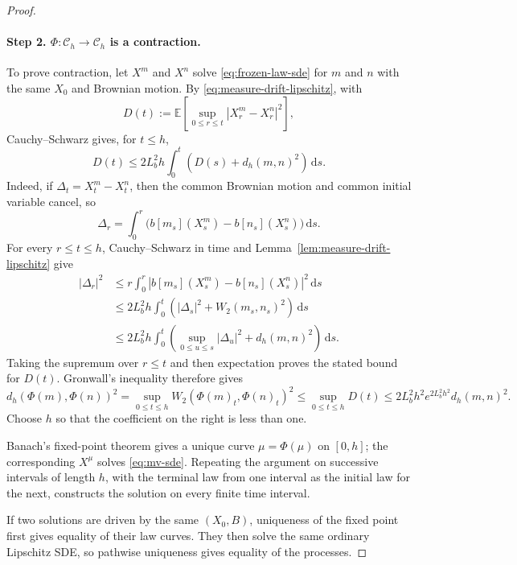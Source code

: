 \documentclass[11pt]{amsart}
\numberwithin{equation}{section}
\theoremstyle{plain}
\newcommand{\E}{\mathbb{E}}
\newcommand{\dd}{\,\mathrm{d}}
\newcommand{\abs}[1]{\left\lvert#1\right\rvert}
\begin{document}
\begin{proof}
\paragraph{\textbf{Step 2. $\Phi:\mathcal C_h\to\mathcal C_h$ is a contraction.}}
To prove contraction, let $X^m$ and $X^n$ solve \eqref{eq:frozen-law-sde} for $m$ and $n$ with the same $X_0$ and Brownian motion.  By \eqref{eq:measure-drift-lipschitz}, with
\[
 D(t):=\E\left[\sup_{0\leq r\leq t}\abs{X_r^m-X_r^n}^2\right],
\]
Cauchy--Schwarz gives, for $t\leq h$,
\[
 D(t)
 \leq 2L_b^2h\int_0^t
       \left(D(s)+d_h(m,n)^2\right)\dd s.
\]
Indeed, if $\Delta_t=X_t^m-X_t^n$, then the common Brownian motion and common
initial variable cancel, so
\[
 \Delta_r=\int_0^r
 \bigl(b[m_s](X_s^m)-b[n_s](X_s^n)\bigr)\dd s.
\]
For every $r\leq t\leq h$, Cauchy--Schwarz in time and
Lemma~\ref{lem:measure-drift-lipschitz} give
\begin{align*}
 \abs{\Delta_r}^2
 &\leq r\int_0^r
 \abs{b[m_s](X_s^m)-b[n_s](X_s^n)}^2\dd s\\
 &\leq 2L_b^2h\int_0^t
 \left(\abs{\Delta_s}^2+W_2(m_s,n_s)^2\right)\dd s\\
 &\leq 2L_b^2h\int_0^t
 \left(\sup_{0\leq u\leq s}\abs{\Delta_u}^2
       +d_h(m,n)^2\right)\dd s.
\end{align*}
Taking the supremum over $r\leq t$ and then expectation proves the stated
bound for $D(t)$.
Gronwall's inequality therefore gives
\begin{equation}\label{eq:phi-contraction}
 d_h(\Phi(m),\Phi(n))^2
 = \sup_{0\leq t\leq h}W_2(\Phi(m)_t,\Phi(n)_t)^2
 \leq \sup_{0\leq t\leq h}D(t)  
 \leq 2L_b^2h^2e^{2L_b^2h^2}d_h(m,n)^2.
\end{equation}
Choose $h$ so that the coefficient on the right is less than one. 

 Banach's fixed-point theorem gives a unique curve $\mu=\Phi(\mu)$ on $[0,h]$; the corresponding $X^\mu$ solves \eqref{eq:mv-sde}.  Repeating the argument on successive intervals of length $h$, with the terminal law from one interval as the initial law for the next, constructs the solution on every finite time interval.

If two solutions are driven by the same $(X_0,B)$, uniqueness of the fixed
point first gives equality of their law curves.  They then solve the same
ordinary Lipschitz SDE, so pathwise uniqueness gives equality of the
processes.


\end{proof}
\end{document}
